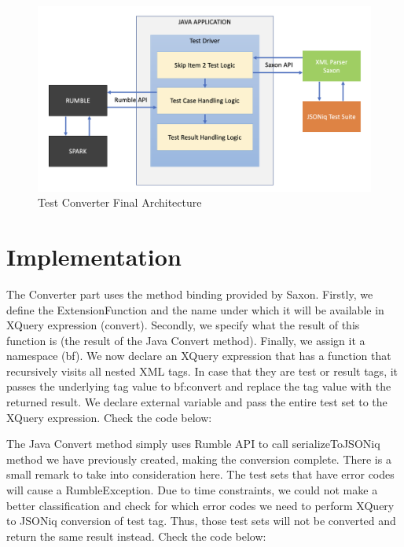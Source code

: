 \begin{figure}[h!]
	\vspace*{-5mm}
	\includegraphics[width=\linewidth]{test_driver_final_architecture.png}
	\vspace*{-8mm}
	\caption{Test Converter Final Architecture}
	\label{fig:test_driver_final_architecture.png}
\end{figure}

\section{Implementation}
The Converter part uses the method binding provided by Saxon. Firstly, we define the ExtensionFunction and the name under which it will be available in XQuery expression (convert). Secondly, we specify what the result of this function is (the result of the Java Convert method). Finally, we assign it a namespace (bf). We now declare an XQuery expression that has a function that recursively visits all nested XML tags. In case that they are test or result tags, it passes the underlying tag value to bf:convert and replace the tag value with the returned result. We declare external variable and pass the entire test set to the XQuery expression. Check the code below:



The Java Convert method simply uses Rumble API to call serializeToJSONiq method we have previously created, making the conversion complete. There is a small remark to take into consideration here. The test sets that have error codes will cause a RumbleException. Due to time constraints, we could not make a better classification and check for which error codes we need to perform XQuery to JSONiq conversion of test tag. Thus, those test sets will not be converted and return the same result instead. Check the code below:

